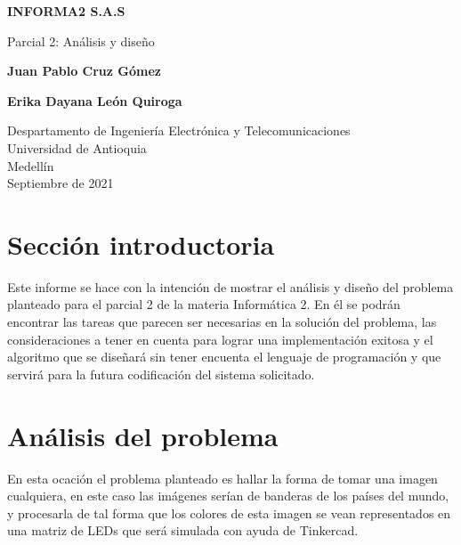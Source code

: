 \documentclass{article}
\begin{document}
\begin{titlepage}
    \begin{center}
        \vspace*{0cm}
            
        \Huge
        \textbf{INFORMA2 S.A.S}
            
        \vspace{0.5cm}
        \LARGE
        Parcial 2: Análisis y diseño 
            
        \vspace{5cm}
            
        \textbf{Juan Pablo Cruz Gómez}
        
        \vspace{0.5cm}
        
        \textbf{Erika Dayana León Quiroga}
            
        \vfill
            
        \vspace{0.8cm}
            
        \Large
        Despartamento de Ingeniería Electrónica y Telecomunicaciones\\
        Universidad de Antioquia\\
        Medellín\\
        Septiembre de 2021
            
    \end{center}
\end{titlepage}

\tableofcontents
\newpage
\section{Sección introductoria}\label{intro}
Este informe se hace con la intención de mostrar el análisis y diseño del problema planteado para el parcial 2 de la materia Informática 2. En él se podrán encontrar las tareas que parecen ser necesarias en la solución del problema, las consideraciones a tener en cuenta para lograr una implementación exitosa y el algoritmo que se diseñará sin tener encuenta el lenguaje de programación y que servirá para la futura codificación del sistema solicitado. 

\section{Análisis del problema} \label{contenido}
En esta ocación el problema planteado es hallar la forma de tomar una imagen cualquiera, en este caso las imágenes serían de banderas de los países del mundo, y procesarla de tal forma que los colores de esta imagen se vean representados en una matriz de LEDs que será simulada con ayuda de Tinkercad.
\end{document}
